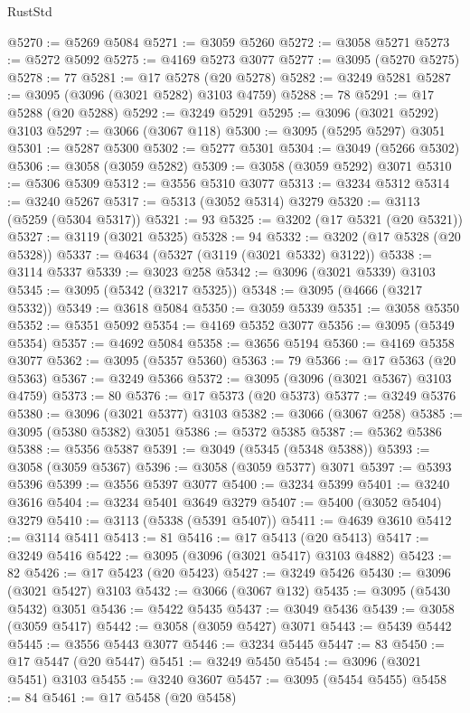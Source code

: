 \begin{lexlean}{RustStd}
\begin{coremodule}
{\begin{coremodule}
{{{{{{{{{{{{{{{{{{{{{{{{{{{{{{{{@5270 := @5269 @5084
@5271 := @3059 @5260
@5272 := @3058 @5271
@5273 := @5272 @5092
@5275 := @4169 @5273 @3077
@5277 := @3095 (@5270 @5275)
@5278 := 77
@5281 := @17 @5278 (@20 @5278)
@5282 := @3249 @5281
@5287 := @3095 (@3096 (@3021 @5282) @3103 @4759)
@5288 := 78
@5291 := @17 @5288 (@20 @5288)
@5292 := @3249 @5291
@5295 := @3096 (@3021 @5292) @3103
@5297 := @3066 (@3067 @118)
@5300 := @3095 (@5295 @5297) @3051
@5301 := @5287 @5300
@5302 := @5277 @5301
@5304 := @3049 (@5266 @5302)
@5306 := @3058 (@3059 @5282)
@5309 := @3058 (@3059 @5292) @3071
@5310 := @5306 @5309
@5312 := @3556 @5310 @3077
@5313 := @3234 @5312
@5314 := @3240 @5267
@5317 := @5313 (@3052 @5314) @3279
@5320 := @3113 (@5259 (@5304 @5317))
@5321 := 93
@5325 := @3202 (@17 @5321 (@20 @5321))
@5327 := @3119 (@3021 @5325)
@5328 := 94
@5332 := @3202 (@17 @5328 (@20 @5328))
@5337 := @4634 (@5327 (@3119 (@3021 @5332) @3122))
@5338 := @3114 @5337
@5339 := @3023 @258
@5342 := @3096 (@3021 @5339) @3103
@5345 := @3095 (@5342 (@3217 @5325))
@5348 := @3095 (@4666 (@3217 @5332))
@5349 := @3618 @5084
@5350 := @3059 @5339
@5351 := @3058 @5350
@5352 := @5351 @5092
@5354 := @4169 @5352 @3077
@5356 := @3095 (@5349 @5354)
@5357 := @4692 @5084
@5358 := @3656 @5194
@5360 := @4169 @5358 @3077
@5362 := @3095 (@5357 @5360)
@5363 := 79
@5366 := @17 @5363 (@20 @5363)
@5367 := @3249 @5366
@5372 := @3095 (@3096 (@3021 @5367) @3103 @4759)
@5373 := 80
@5376 := @17 @5373 (@20 @5373)
@5377 := @3249 @5376
@5380 := @3096 (@3021 @5377) @3103
@5382 := @3066 (@3067 @258)
@5385 := @3095 (@5380 @5382) @3051
@5386 := @5372 @5385
@5387 := @5362 @5386
@5388 := @5356 @5387
@5391 := @3049 (@5345 (@5348 @5388))
@5393 := @3058 (@3059 @5367)
@5396 := @3058 (@3059 @5377) @3071
@5397 := @5393 @5396
@5399 := @3556 @5397 @3077
@5400 := @3234 @5399
@5401 := @3240 @3616
@5404 := @3234 @5401 @3649 @3279
@5407 := @5400 (@3052 @5404) @3279
@5410 := @3113 (@5338 (@5391 @5407))
@5411 := @4639 @3610
@5412 := @3114 @5411
@5413 := 81
@5416 := @17 @5413 (@20 @5413)
@5417 := @3249 @5416
@5422 := @3095 (@3096 (@3021 @5417) @3103 @4882)
@5423 := 82
@5426 := @17 @5423 (@20 @5423)
@5427 := @3249 @5426
@5430 := @3096 (@3021 @5427) @3103
@5432 := @3066 (@3067 @132)
@5435 := @3095 (@5430 @5432) @3051
@5436 := @5422 @5435
@5437 := @3049 @5436
@5439 := @3058 (@3059 @5417)
@5442 := @3058 (@3059 @5427) @3071
@5443 := @5439 @5442
@5445 := @3556 @5443 @3077
@5446 := @3234 @5445
@5447 := 83
@5450 := @17 @5447 (@20 @5447)
@5451 := @3249 @5450
@5454 := @3096 (@3021 @5451) @3103
@5455 := @3240 @3607
@5457 := @3095 (@5454 @5455)
@5458 := 84
@5461 := @17 @5458 (@20 @5458)
}}}}}}}}}}}}}}}}}}}}}}}}}}}}}}}}
\end{coremodule}}
\end{coremodule}
\end{lexlean}
